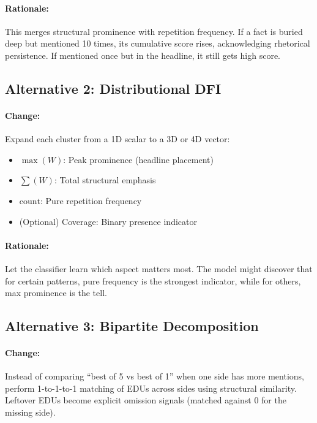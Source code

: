 \documentclass[12pt,a4paper]{article}
\begin{document}
\paragraph{Rationale:} This merges structural prominence with repetition frequency. If a fact
is buried deep but mentioned 10 times, its cumulative score rises, acknowledging rhetorical
persistence. If mentioned once but in the headline, it still gets high score.

\subsection{Alternative 2: Distributional DFI}

\paragraph{Change:} Expand each cluster from a 1D scalar to a 3D or 4D vector:
\begin{itemize}
\item $\max(W)$: Peak prominence (headline placement)
\item $\sum(W)$: Total structural emphasis
\item $\text{count}$: Pure repetition frequency
\item (Optional) Coverage: Binary presence indicator
\end{itemize}

\paragraph{Rationale:} Let the classifier learn which aspect matters most. The model might
discover that for certain patterns, pure frequency is the strongest indicator, while for
others, max prominence is the tell.

\subsection{Alternative 3: Bipartite Decomposition}

\paragraph{Change:} Instead of comparing ``best of 5 vs best of 1'' when one side has more
mentions, perform 1-to-1-to-1 matching of EDUs across sides using structural similarity.
Leftover EDUs become explicit omission signals (matched against 0 for the missing side).
\end{document}
